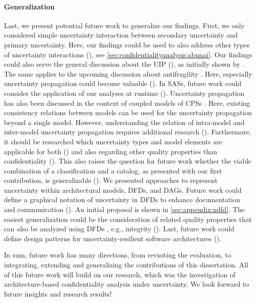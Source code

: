 \paragraph{Generalization}
Last, we present potential future work to generalize our findings.
First, we only considered simple uncertainty interaction between secondary uncertainty and primary uncertainty.
Here, our findings could be used to also address other types of uncertainty interactions (), see \autoref{sec:confidentialityanalysis:abunai}.
Our findings could also serve the general discussion about the \ac{UIP} \cite{camara_addressing_2022,camara_uncertainty_2022,weyns_towards_2023} (), as initially shown by \textcite{camara_uncertainty_2024}.
The same applies to the upcoming discussion about antifragility \cite{grassi_towards_2023,gorgeon_anti-fragile_2015,de_bruijn_antifragility_2020,grassi_tao_2021,ramezani_approaches_2020,burton_resilience_2024}.
Here, especially uncertainty propagation could become valuable ().
In \acp{SAS}, future work could consider the application of our analyses at runtime ().
Uncertainty propagation has also been discussed in the context of coupled models of \acp{CPS} \cite{acosta_uncertainty_2022}.
Here, existing consistency relations between models can be used for the uncertainty propagation beyond a single model.
However, understanding the relation of intra-model and inter-model uncertainty propagation requires additional research ().
Furthermore, it should be researched which uncertainty types and model elements are applicable for both () and also regarding other quality properties than confidentiality (). 
This also raises the question for future work whether the viable combination of a classification and a catalog, as presented with our first contribution, is generalizable ().
We presented approaches to represent uncertainty within architectural models, \acp{DFD}, and \acp{DAG}.
Future work could define a graphical notation of uncertainty in \acp{DFD} to enhance documentation and communication ().
An initial proposal is shown in \autoref{sec:appendix:ndfd}.
The easiest generalization could be the consideration of related quality properties that can also be analyzed using \acp{DFD} \cite{boltz_extensible_2024}, e.g., integrity ().
Last, future work could define design patterns for uncertainty-resilient software architectures ().

In sum, future work has many directions, from revisiting the evaluation, to integrating, extending and generalizing the contributions of this dissertation.
All of this future work will build on our research, which was the investigation of architecture-based confidentiality analysis under uncertainty. 
We look forward to future insights and research results!






